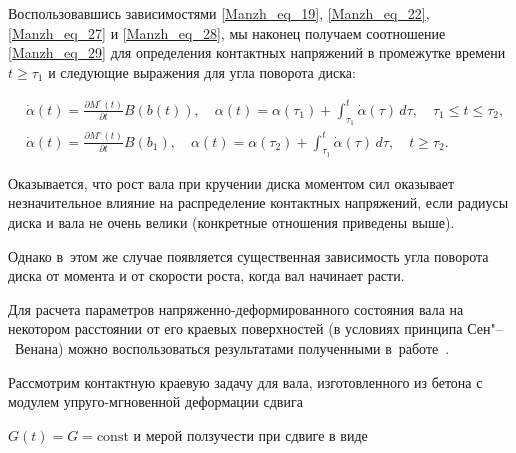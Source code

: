 \newpage



Воспользовавшись зависимостями \eqref{Manzh_eq_19}, \eqref{Manzh_eq_22}, \eqref{Manzh_eq_27} и \eqref{Manzh_eq_28}, мы наконец получаем соотношение \eqref{Manzh_eq_29} для определения контактных напряжений в промежутке времени $t\geq\tau_1$ и следующие выражения для угла поворота диска: 

\begin{align*}

  &

  \dot\alpha(t)=\frac{\partial M^\circ(t)}{\partial t}B(b(t)),\quad

  \alpha(t)=\alpha(\tau_1)+\int_{\tau_1}^t\dot\alpha(\tau)\,d\tau,

\quad \tau_1\leq t\leq\tau_2,

\\

  &

  \dot\alpha(t)=\frac{\partial M^\circ(t)}{\partial t}B(b_1),\quad

  \alpha(t)=\alpha(\tau_2)+\int_{\tau_1}^t\dot\alpha(\tau)\,d\tau, 

\quad t\geq\tau_2.

\end{align*}



Оказывается, что рост вала при кручении диска моментом сил оказывает незначительное влияние на распределение контактных напряжений, если радиусы диска и вала не очень велики (конкретные отношения приведены выше). 

Однако в~этом же случае появляется существенная зависимость угла поворота диска от момента и от скорости роста, когда вал начинает расти.



Для расчета параметров напряженно-деформированного состояния вала на некотором расстоянии от его краевых поверхностей (в условиях принципа Сен"--~Венана) можно воспользоваться результатами полученными в~работе~\cite{Manzh_bib_18}.



\smallskip




Рассмотрим контактную краевую задачу для вала, изготовленного из бетона с модулем упруго-мгновенной деформации сдвига

$G(t)=G=\mathrm{const}$ и мерой ползучести при сдвиге в виде~\cite{Manzh_bib_01}

